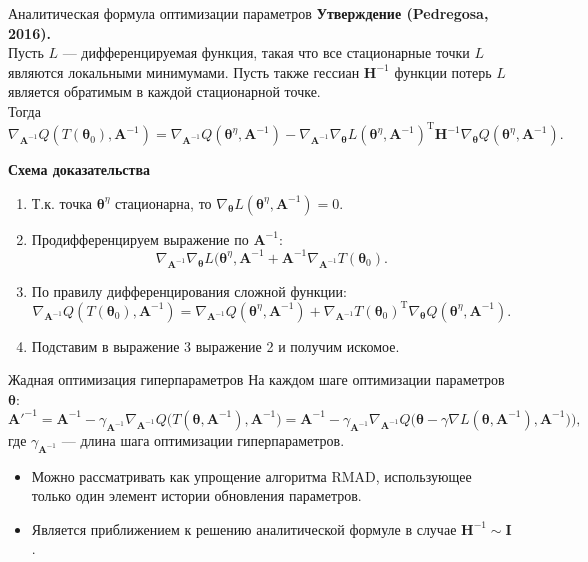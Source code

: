 \documentclass[10pt,pdf,utf8,russian,aspectratio=169]{beamer}
\begin{document}
\begin{frame}{Аналитическая формула оптимизации параметров}
\textbf{Утверждение (Pedregosa, 2016).}\\
Пусть $L$ --- дифференцируемая функция, такая что все стационарные точки $L$ являются локальными минимумами.
Пусть также гессиан $\mathbf{H}^{-1}$ функции потерь $L$ является обратимым в каждой стационарной точке.\\
Тогда
\[
\nabla_{\mathbf{A}^{-1}}Q(T(\boldsymbol{\theta}_0), \mathbf{A}^{-1}) =  \nabla_{\mathbf{A}^{-1}}Q(\boldsymbol{\theta}^\eta, \mathbf{A}^{-1}) - \nabla_{\mathbf{A}^{-1}}\nabla_{\boldsymbol{\theta}} L(\boldsymbol{\theta}^\eta, \mathbf{A}^{-1})^\text{T}\mathbf{H}^{-1}\nabla_{\boldsymbol{\theta}}Q(\boldsymbol{\theta}^\eta, \mathbf{A}^{-1}).
\]

\textbf{Схема доказательства}\\
\begin{enumerate}
\item Т.к. точка $\boldsymbol{\theta}^\eta$ стационарна, то $\nabla_{\boldsymbol{\theta}} L(\boldsymbol{\theta}^\eta, \mathbf{A}^{-1}) = 0$.
\item Продифференцируем выражение по $\mathbf{A}^{-1}:$
\[
    \nabla_{\mathbf{A}^{-1}}\nabla_{\boldsymbol{\theta}} L(\boldsymbol{\theta}^\eta, \mathbf{A}^{-1} + \mathbf{A}^{-1}\nabla_{\mathbf{A}^{-1}}T(\boldsymbol{\theta}_0).
\]
\item По правилу дифференцирования сложной функции:
\[
\nabla_{\mathbf{A}^{-1}}Q(T(\boldsymbol{\theta}_0), \mathbf{A}^{-1}) =  \nabla_{\mathbf{A}^{-1}}Q(\boldsymbol{\theta}^\eta, \mathbf{A}^{-1})  + \nabla_{\mathbf{A}^{-1}}T(\boldsymbol{\theta}_0)^\text{T}\nabla_{\boldsymbol{\theta}}Q(\boldsymbol{\theta}^\eta, \mathbf{A}^{-1}).
\]
\item Подставим в выражение 3 выражение 2 и получим искомое.
\end{enumerate}
\end{frame}


\begin{frame}{Жадная оптимизация гиперпараметров}
На каждом шаге оптимизации параметров $\boldsymbol{\theta}$:
\[
	\mathbf{A}'^{-1} = \mathbf{A}^{-1} - \gamma_{\mathbf{A}^{-1}} \nabla_{\mathbf{A}^{-1}}  Q \bigl(T(\boldsymbol{\theta}, \mathbf{A}^{-1}) , \mathbf{A}^{-1}\bigr) = \mathbf{A}^{-1} - \gamma_{\mathbf{A}^{-1}} \nabla_{\mathbf{A}^{-1}}  Q\bigl(\boldsymbol{\theta} - \gamma \nabla L(\boldsymbol{\theta}, \mathbf{A}^{-1}), \mathbf{A}^{-1})\bigr),
\]
где $\gamma_{\mathbf{A}^{-1}}$ --- длина шага оптимизации гиперпараметров.

\begin{itemize}
\item Можно рассматривать как упрощение алгоритма RMAD, использующее только один элемент истории обновления параметров.
\item Является приближением к решению аналитической формуле в случае $\mathbf{H}^{-1} \sim \mathbf{I}$.
\end{itemize}

\end{frame}
\end{document}
